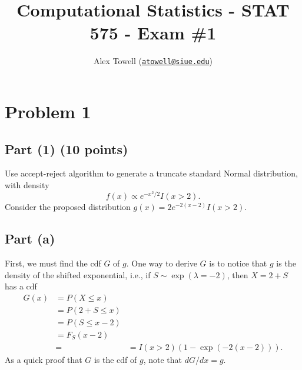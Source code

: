 \documentclass[
]{article}
\title{Computational Statistics - STAT 575 - Exam \#1}
\author{Alex Towell
(\href{mailto:atowell@siue.edu}{\nolinkurl{atowell@siue.edu}})}
\date{}
\begin{document}
\maketitle

\newcommand{\var}{\operatorname{Var}}
\newcommand{\expect}{\operatorname{E}}
\newcommand{\cov}{\operatorname{Cov}}
\newcommand{\se}{\operatorname{SE}}
\newcommand{\mat}[1]{\mathbf{#1}} 
\newcommand{\eval}[2]{\left. #1 \right\vert_{#2}}
\newcommand{\poi}{\operatorname{POI}}
\newcommand{\argmax}{\operatorname{arg\,max}}

\hypertarget{problem-1}{%
\section{Problem 1}\label{problem-1}}

\hypertarget{part-1-10-points}{%
\subsection{Part (1) (10 points)}\label{part-1-10-points}}

Use accept-reject algorithm to generate a truncate standard Normal
distribution, with density \[
  f(x) ∝ e^{-x^2/2}I(x > 2).
\] Consider the proposed distribution \(g(x) = 2 e^{−2(x−2)}I(x > 2)\).

\hypertarget{part-a}{%
\subsection{Part (a)}\label{part-a}}


First, we must find the cdf \(G\) of \(g\). One way to derive \(G\) is
to notice that \(g\) is the density of the shifted exponential, i.e., if
\(S \sim \exp(\lambda=-2)\), then \(X = 2 + S\) has a cdf \begin{align}
  G(x) &= P(X \leq x)\\
       &= P(2+S \leq x)\\
       &= P(S \leq x-2)\\
       &= F_S(x-2)\\
       &= &= I(x > 2)(1 - \exp(-2(x-2))).
\end{align} As a quick proof that \(G\) is the cdf of \(g\), note that
\(dG/dx = g\).
\end{document}
